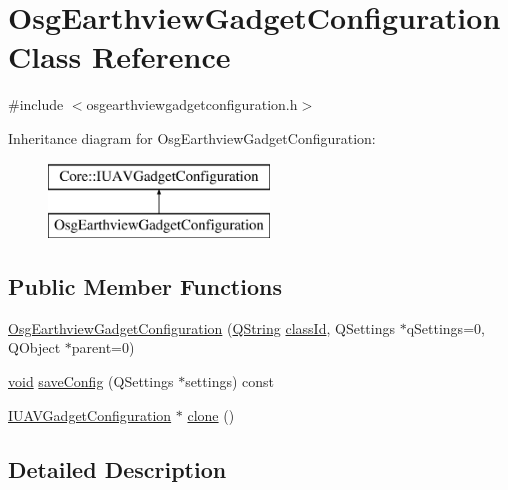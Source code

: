 \hypertarget{class_osg_earthview_gadget_configuration}{\section{\-Osg\-Earthview\-Gadget\-Configuration \-Class \-Reference}
\label{class_osg_earthview_gadget_configuration}
}


{\ttfamily \#include $<$osgearthviewgadgetconfiguration.\-h$>$}

\-Inheritance diagram for \-Osg\-Earthview\-Gadget\-Configuration\-:\begin{figure}[H]
\begin{center}
\leavevmode
\includegraphics[height=2.000000cm]{class_osg_earthview_gadget_configuration}
\end{center}
\end{figure}
\subsection*{\-Public \-Member \-Functions}
\begin{DoxyCompactItemize}
\item 
\hyperlink{class_osg_earthview_gadget_configuration_a3f1d9877b4ce0bbda5ac9628c39ebe63}{\-Osg\-Earthview\-Gadget\-Configuration} (\hyperlink{group___u_a_v_objects_plugin_gab9d252f49c333c94a72f97ce3105a32d}{\-Q\-String} \hyperlink{group___core_plugin_gac953657221ba7fda967ada0408332641}{class\-Id}, \-Q\-Settings $\ast$q\-Settings=0, \-Q\-Object $\ast$parent=0)
\item 
\hyperlink{group___u_a_v_objects_plugin_ga444cf2ff3f0ecbe028adce838d373f5c}{void} \hyperlink{class_osg_earthview_gadget_configuration_a2b06ccd271866ae4acfa83524bbabd1b}{save\-Config} (\-Q\-Settings $\ast$settings) const 
\item 
\hyperlink{group___core_plugin_gacdfdf0b1e39b5002472b76b6564ce51f}{\-I\-U\-A\-V\-Gadget\-Configuration} $\ast$ \hyperlink{class_osg_earthview_gadget_configuration_a5b99c466e1f2790b5faf0f26bb1a4bce}{clone} ()
\end{DoxyCompactItemize}


\subsection{\-Detailed \-Description}


